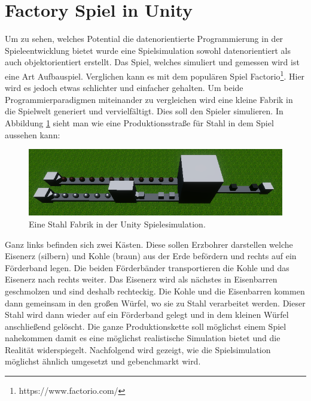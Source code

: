 \section{Factory Spiel in Unity}\label{sec:factory}
Um zu sehen, welches Potential die datenorientierte Programmierung in der Spieleentwicklung bietet wurde eine Spielsimulation sowohl datenorientiert als auch objektorientiert erstellt. Das Spiel, welches simuliert und gemessen wird ist eine Art Aufbauspiel. Verglichen kann es mit dem populären Spiel Factorio\footnote{https://www.factorio.com/}. Hier wird es jedoch etwas schlichter und einfacher gehalten. Um beide Programmierparadigmen miteinander zu vergleichen wird eine kleine Fabrik in die Spielwelt generiert und vervielfältigt. Dies soll den Spieler simulieren. In Abbildung \ref{fig:steel} sieht man wie eine Produktionsstraße für Stahl in dem Spiel aussehen kann:
\begin{figure}[H]
\includegraphics[scale=0.87]{Bilder/Stahl Fabrik.png}
\caption{Eine Stahl Fabrik in der Unity Spielesimulation.}
\label{fig:steel}
\end{figure}
Ganz links befinden sich zwei Kästen. Diese sollen Erzbohrer darstellen welche Eisenerz (silbern) und Kohle (braun) aus der Erde befördern und rechts auf ein Förderband legen. Die beiden Förderbänder transportieren die Kohle und das Eisenerz nach rechts weiter. Das Eisenerz wird als nächstes in Eisenbarren geschmolzen und sind deshalb rechteckig. Die Kohle und die Eisenbarren kommen dann gemeinsam in den großen Würfel, wo sie zu Stahl verarbeitet werden. Dieser Stahl wird dann wieder auf ein Förderband gelegt und in dem kleinen Würfel anschließend gelöscht. Die ganze Produktionskette soll möglichst einem Spiel nahekommen damit es eine möglichst realistische Simulation bietet und die Realität widerspiegelt. Nachfolgend wird gezeigt, wie die Spielsimulation möglichst ähnlich umgesetzt und gebenchmarkt wird.

